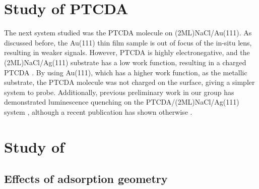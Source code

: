\section{Study of {PTCDA}}

The next system studied was the \ac{PTCDA} molecule on (2ML)NaCl/Au(111). As discussed before, the Au(111) thin film sample is out of focus of the in-situ lens, resulting in weaker signals. However, \ac{PTCDA} is highly electronegative, and the (2ML)NaCl/Ag(111) substrate has a low work function, resulting in a charged PTCDA \citep{cochrane2017single,cochrane2018molecularly}. By using Au(111), which has a higher work function, as the metallic substrate, the PTCDA molecule was not charged on the surface, giving a simpler system to probe. Additionally, previous preliminary work in our group has demonstrated luminescence quenching on the PTCDA/(2ML)NaCl/Ag(111) system \citep{roussy2016coupling}, although a recent publication has shown otherwise \citep{Kimura2019}.




\section{Study of }






\subsection{Effects of adsorption geometry}





